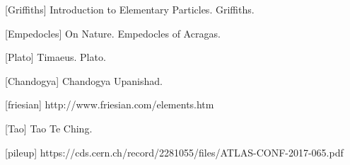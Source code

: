 [Griffiths] Introduction to Elementary Particles. Griffiths.

[Empedocles] On Nature. Empedocles of Acragas.

[Plato] Timaeus. Plato.

[Chandogya] Chandogya Upanishad.

[friesian] http://www.friesian.com/elements.htm

[Tao] Tao Te Ching.

[pileup] https://cds.cern.ch/record/2281055/files/ATLAS-CONF-2017-065.pdf